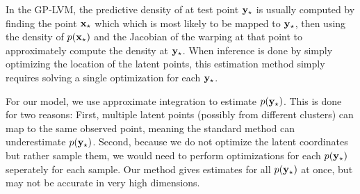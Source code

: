 In the GP-LVM, the predictive density of at test point ${\bf{y}}_\star$ is usually computed by finding the point ${\bf{x}}_\star$ which which is most likely to be mapped to ${\bf{y}}_\star$, then using the density of $p({\bf{x}}_\star)$ and the Jacobian of the warping at that point to approximately compute the density at ${\bf{y}}_\star$.
When inference is done by simply optimizing the location of the latent points, this estimation method simply requires solving a single optimization for each ${\bf{y}}_\star$.  

For our model, we use approximate integration to estimate $p({\bf{y}}_\star)$.
This is done for two reasons:
First, multiple latent points (possibly from different clusters) can map to the same observed point, meaning the standard method can underestimate $p({\bf{y}}_\star)$.
Second, because we do not optimize the latent coordinates but rather sample them, we would need to perform optimizations for each $p({\bf{y}}_\star)$ seperately for each sample.
Our method gives estimates for all $p({\bf{y}}_\star)$ at once, but may not be accurate in very high dimensions.


